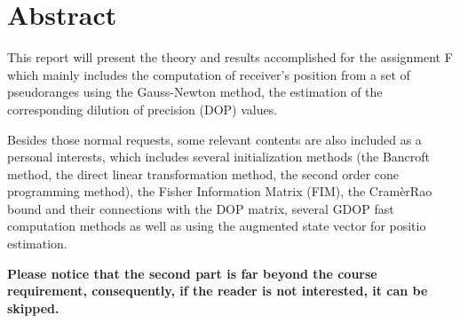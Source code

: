 \chapter{Abstract}
This report will present the theory and results accomplished for the assignment F which mainly includes the computation of receiver's position from a set of pseudoranges using the Gauss-Newton method, the estimation of the corresponding dilution of precision (DOP) values.

Besides those normal requests, some relevant contents are also included 
as a personal interests, which includes several initialization 
methods (the Bancroft method, the direct linear transformation method, 
the second order cone programming method), the Fisher Information Matrix 
(FIM), the Cram\`erRao bound and their connections with the DOP matrix, 
several GDOP fast computation methods as well as using the augmented state vector for positio estimation.


\textbf{Please notice that the second part is far beyond the course requirement, consequently, if the reader is not interested, it can be skipped.}

